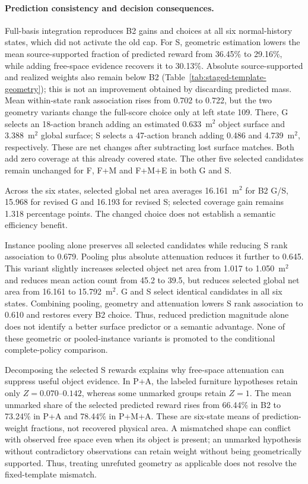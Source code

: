 \paragraph{Prediction consistency and decision consequences.}
Full-basis integration reproduces B2 gains and choices at all six normal-history states, which did not activate the old cap. For S, geometric estimation lowers the mean source-supported fraction of predicted reward from 36.45\% to 29.16\%, while adding free-space evidence recovers it to 30.13\%. Absolute source-supported and realized weights also remain below B2 (Table~\ref{tab:staged-template-geometry}); this is not an improvement obtained by discarding predicted mass. Mean within-state rank association rises from 0.702 to 0.722, but the two geometry variants change the full-score choice only at left state 109. There, G selects an 18-action branch adding an estimated 0.633~m$^2$ object surface and 3.388~m$^2$ global surface; S selects a 47-action branch adding 0.486 and 4.739~m$^2$, respectively. These are net changes after subtracting lost surface matches. Both add zero coverage at this already covered state. The other five selected candidates remain unchanged for F, F+M and F+M+E in both G and S.

Across the six states, selected global net area averages 16.161~m$^2$ for B2 G/S, 15.968 for revised G and 16.193 for revised S; selected coverage gain remains 1.318 percentage points. The changed choice does not establish a semantic efficiency benefit.

Instance pooling alone preserves all selected candidates while reducing S rank association to 0.679. Pooling plus absolute attenuation reduces it further to 0.645. This variant slightly increases selected object net area from 1.017 to 1.050~m$^2$ and reduces mean action count from 45.2 to 39.5, but reduces selected global net area from 16.161 to 15.792~m$^2$. G and S select identical candidates in all six states. Combining pooling, geometry and attenuation lowers S rank association to 0.610 and restores every B2 choice. Thus, reduced prediction magnitude alone does not identify a better surface predictor or a semantic advantage. None of these geometric or pooled-instance variants is promoted to the conditional complete-policy comparison.

Decomposing the selected S rewards explains why free-space attenuation can suppress useful object evidence. In P+A, the labeled furniture hypotheses retain only $Z=0.070$--$0.142$, whereas some unmarked groups retain $Z=1$. The mean unmarked share of the selected predicted reward rises from 66.44\% in B2 to 73.24\% in P+A and 78.44\% in P+M+A. These are six-state means of prediction-weight fractions, not recovered physical area. A mismatched shape can conflict with observed free space even when its object is present; an unmarked hypothesis without contradictory observations can retain weight without being geometrically supported. Thus, treating unrefuted geometry as applicable does not resolve the fixed-template mismatch.

